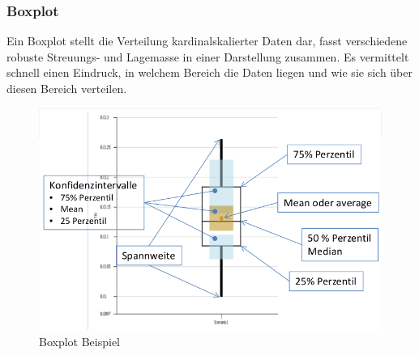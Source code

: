 \subsubsection{Boxplot}
Ein Boxplot stellt die Verteilung kardinalskalierter Daten dar, fasst verschiedene robuste Streuungs- und Lagemasse in einer Darstellung zusammen. Es vermittelt schnell einen Eindruck, in welchem Bereich die Daten liegen und wie sie sich über diesen Bereich verteilen.
\begin{figure}[htb]
\centering
\includegraphics[scale=0.5]{images/exev_haufigkeitsverteilung_boxplot_1.png}
\caption{Boxplot Beispiel}
\label{fig:theory:boxplot:1}
\end{figure}
